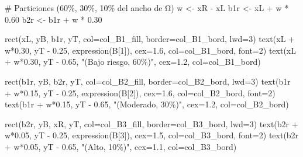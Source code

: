 \documentclass[
  letterpaper,
  DIV=11,
  numbers=noendperiod]{scrartcl}
\newenvironment{Shaded}{\begin{snugshade}}{\end{snugshade}}
\newcommand{\AttributeTok}[1]{\textcolor[rgb]{0.40,0.45,0.13}{#1}}
\newcommand{\CommentTok}[1]{\textcolor[rgb]{0.37,0.37,0.37}{#1}}
\newcommand{\DecValTok}[1]{\textcolor[rgb]{0.68,0.00,0.00}{#1}}
\newcommand{\FloatTok}[1]{\textcolor[rgb]{0.68,0.00,0.00}{#1}}
\newcommand{\FunctionTok}[1]{\textcolor[rgb]{0.28,0.35,0.67}{#1}}
\newcommand{\NormalTok}[1]{\textcolor[rgb]{0.00,0.23,0.31}{#1}}
\newcommand{\OtherTok}[1]{\textcolor[rgb]{0.00,0.23,0.31}{#1}}
\newcommand{\SpecialCharTok}[1]{\textcolor[rgb]{0.37,0.37,0.37}{#1}}
\newcommand{\StringTok}[1]{\textcolor[rgb]{0.13,0.47,0.30}{#1}}
\begin{document}
\begin{Shaded}
\begin{Highlighting}[]
\CommentTok{\# Particiones (60\%, 30\%, 10\% del ancho de Ω)}
\NormalTok{w }\OtherTok{\textless{}{-}}\NormalTok{ xR }\SpecialCharTok{{-}}\NormalTok{ xL}
\NormalTok{b1r }\OtherTok{\textless{}{-}}\NormalTok{ xL }\SpecialCharTok{+}\NormalTok{ w }\SpecialCharTok{*} \FloatTok{0.60}
\NormalTok{b2r }\OtherTok{\textless{}{-}}\NormalTok{ b1r }\SpecialCharTok{+}\NormalTok{ w }\SpecialCharTok{*} \FloatTok{0.30}

\FunctionTok{rect}\NormalTok{(xL,  yB, b1r, yT, }\AttributeTok{col=}\NormalTok{col\_B1\_fill, }\AttributeTok{border=}\NormalTok{col\_B1\_bord, }\AttributeTok{lwd=}\DecValTok{3}\NormalTok{)}
\FunctionTok{text}\NormalTok{(xL }\SpecialCharTok{+}\NormalTok{ w}\SpecialCharTok{*}\FloatTok{0.30}\NormalTok{, yT }\SpecialCharTok{{-}} \FloatTok{0.25}\NormalTok{, }\FunctionTok{expression}\NormalTok{(B[}\DecValTok{1}\NormalTok{]), }\AttributeTok{cex=}\FloatTok{1.6}\NormalTok{, }\AttributeTok{col=}\NormalTok{col\_B1\_bord, }\AttributeTok{font=}\DecValTok{2}\NormalTok{)}
\FunctionTok{text}\NormalTok{(xL }\SpecialCharTok{+}\NormalTok{ w}\SpecialCharTok{*}\FloatTok{0.30}\NormalTok{, yT }\SpecialCharTok{{-}} \FloatTok{0.65}\NormalTok{, }\StringTok{"(Bajo riesgo, 60\%)"}\NormalTok{, }\AttributeTok{cex=}\FloatTok{1.2}\NormalTok{, }\AttributeTok{col=}\NormalTok{col\_B1\_bord)}

\FunctionTok{rect}\NormalTok{(b1r, yB, b2r, yT, }\AttributeTok{col=}\NormalTok{col\_B2\_fill, }\AttributeTok{border=}\NormalTok{col\_B2\_bord, }\AttributeTok{lwd=}\DecValTok{3}\NormalTok{)}
\FunctionTok{text}\NormalTok{(b1r }\SpecialCharTok{+}\NormalTok{ w}\SpecialCharTok{*}\FloatTok{0.15}\NormalTok{, yT }\SpecialCharTok{{-}} \FloatTok{0.25}\NormalTok{, }\FunctionTok{expression}\NormalTok{(B[}\DecValTok{2}\NormalTok{]), }\AttributeTok{cex=}\FloatTok{1.6}\NormalTok{, }\AttributeTok{col=}\NormalTok{col\_B2\_bord, }\AttributeTok{font=}\DecValTok{2}\NormalTok{)}
\FunctionTok{text}\NormalTok{(b1r }\SpecialCharTok{+}\NormalTok{ w}\SpecialCharTok{*}\FloatTok{0.15}\NormalTok{, yT }\SpecialCharTok{{-}} \FloatTok{0.65}\NormalTok{, }\StringTok{"(Moderado, 30\%)"}\NormalTok{, }\AttributeTok{cex=}\FloatTok{1.2}\NormalTok{, }\AttributeTok{col=}\NormalTok{col\_B2\_bord)}

\FunctionTok{rect}\NormalTok{(b2r, yB, xR,  yT, }\AttributeTok{col=}\NormalTok{col\_B3\_fill, }\AttributeTok{border=}\NormalTok{col\_B3\_bord, }\AttributeTok{lwd=}\DecValTok{3}\NormalTok{)}
\FunctionTok{text}\NormalTok{(b2r }\SpecialCharTok{+}\NormalTok{ w}\SpecialCharTok{*}\FloatTok{0.05}\NormalTok{, yT }\SpecialCharTok{{-}} \FloatTok{0.25}\NormalTok{, }\FunctionTok{expression}\NormalTok{(B[}\DecValTok{3}\NormalTok{]), }\AttributeTok{cex=}\FloatTok{1.5}\NormalTok{, }\AttributeTok{col=}\NormalTok{col\_B3\_bord, }\AttributeTok{font=}\DecValTok{2}\NormalTok{)}
\FunctionTok{text}\NormalTok{(b2r }\SpecialCharTok{+}\NormalTok{ w}\SpecialCharTok{*}\FloatTok{0.05}\NormalTok{, yT }\SpecialCharTok{{-}} \FloatTok{0.65}\NormalTok{, }\StringTok{"(Alto, 10\%)"}\NormalTok{, }\AttributeTok{cex=}\FloatTok{1.1}\NormalTok{, }\AttributeTok{col=}\NormalTok{col\_B3\_bord)}


\end{Highlighting}
\end{Shaded}
\end{document}
